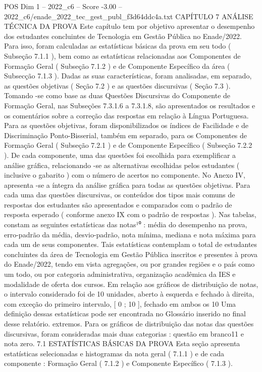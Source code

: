 \begin{textsample}{POS Dim 1 – 2022\_c6 – Score -3.00 – 2022\_c6/enade\_2022\_tec\_gest\_publ\_f3d64ddc4a.txt}  \label{ex:f1_pos_269}
CAPÍTULO 7 ANÁLISE TÉCNICA DA PROVA Este capítulo tem por objetivo apresentar o desempenho dos estudantes concluintes de Tecnologia em Gestão Pública no Enade/2022.
Para isso, foram calculadas as estatísticas básicas da prova em seu todo ( Subseção 7.1.1 ), bem como as estatísticas relacionadas aos Componentes de Formação Geral ( Subseção 7.1.2 ) e de Componente Específico da área ( Subsecção 7.1.3 ).
Dadas as suas características, foram analisadas, em separado, as questões objetivas ( Seção 7.2 ) e as questões discursivas ( Seção 7.3 ).
Tomando -se como base as duas Questões Discursivas do Componente de Formação Geral, nas Subseções 7.3.1.6 a 7.3.1.8, são apresentados os resultados e os comentários sobre a correção das respostas em relação à Língua Portuguesa.
Para as questões objetivas, foram disponibilizados os índices de Facilidade e de Discriminação Ponto-Bisserial, também em separado, para os Componentes de Formação Geral ( Subseção 7.2.1 ) e de Componente Específico ( Subseção 7.2.2 ).
De cada componente, uma das questões foi escolhida para exemplificar a análise gráfica, relacionando -se as alternativas escolhidas pelos estudantes ( inclusive o gabarito ) com o número de acertos no componente.
No Anexo IV, apresenta -se a íntegra da análise gráfica para todas as questões objetivas.
Para cada uma das questões discursivas, os conteúdos dos tipos mais comuns de respostas dos estudantes são apresentados e comparados com o padrão de resposta esperado ( conforme anexo IX com o padrão de respostas ).
Nas tabelas, constam as seguintes estatísticas das notas¹⁰ : média do desempenho na prova, erro-padrão da média, desvio-padrão, nota mínima, mediana e nota máxima para cada um de seus componentes.
Tais estatísticas contemplam o total de estudantes concluintes da área de Tecnologia em Gestão Pública inscritos e presentes à prova do Enade/2022, tendo em vista agregações, ou por grandes regiões e o país como um todo, ou por categoria administrativa, organização acadêmica da IES e modalidade de oferta dos cursos.
Em relação aos gráficos de distribuição de notas, o intervalo considerado foi de 10 unidades, aberto à esquerda e fechado à direita, com exceção do primeiro intervalo, [ 0 ; 10 ], fechado em ambos os 10 Uma definição dessas estatísticas pode ser encontrada no Glossário inserido no final desse relatório. extremos.
Para os gráficos de distribuição das notas das questões discursivas, foram consideradas mais duas categorias : questão em branco11 e nota zero. 7.1 ESTATÍSTICAS BÁSICAS DA PROVA Esta seção apresenta estatísticas selecionadas e histogramas da nota geral ( 7.1.1 ) e de cada componente : Formação Geral ( 7.1.2 ) e Componente Específico ( 7.1.3 ).

\end{textsample}
